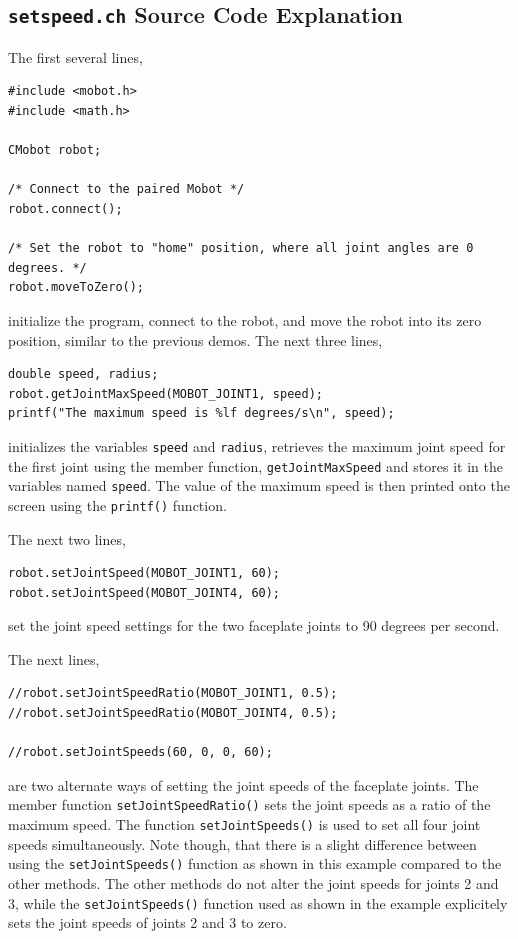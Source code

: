 \documentclass{article}
\begin{document}
\subsection{\texttt{setspeed.ch} Source Code Explanation}
The first several lines,
\begin{verbatim}
#include <mobot.h>
#include <math.h>

CMobot robot;

/* Connect to the paired Mobot */
robot.connect();

/* Set the robot to "home" position, where all joint angles are 0 degrees. */
robot.moveToZero();
\end{verbatim}
initialize the program, connect to the robot, and move the robot into its zero position,
similar to the previous demos. The next three lines,
\begin{verbatim}
double speed, radius;
robot.getJointMaxSpeed(MOBOT_JOINT1, speed);
printf("The maximum speed is %lf degrees/s\n", speed);
\end{verbatim}
initializes the variables \texttt{speed} and \texttt{radius},
retrieves the maximum joint speed for the first joint using the member function,
\texttt{getJointMaxSpeed} and stores it in the variables named \texttt{speed}.
The value of the maximum speed is then printed onto the screen using the \texttt{printf()}
function.

The next two lines,
\begin{verbatim}
robot.setJointSpeed(MOBOT_JOINT1, 60);
robot.setJointSpeed(MOBOT_JOINT4, 60);
\end{verbatim}
set the joint speed settings for the two faceplate joints to 90 degrees per second.

The next lines, 
\begin{verbatim}
//robot.setJointSpeedRatio(MOBOT_JOINT1, 0.5);
//robot.setJointSpeedRatio(MOBOT_JOINT4, 0.5);

//robot.setJointSpeeds(60, 0, 0, 60);
\end{verbatim}
are two alternate ways of setting the joint speeds of the faceplate joints. 
The member function \texttt{setJointSpeedRatio()} sets the joint speeds as a ratio of the 
maximum speed. The function \texttt{setJointSpeeds()} is used to set all four
joint speeds simultaneously. Note though, that there is a slight difference between
using the \texttt{setJointSpeeds()} function as shown in this example compared to the
other methods. The other methods do not alter the joint speeds for joints 2 and 3, while
the \texttt{setJointSpeeds()} function used as shown in the example explicitely sets
the joint speeds of joints 2 and 3 to zero. 
\end{document}
